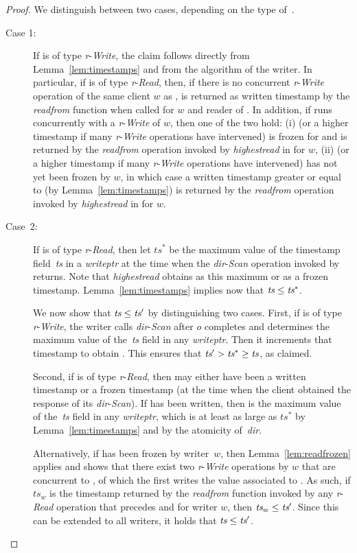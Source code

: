 \documentclass[oribibl]{llncs}
\theoremstyle{definition-boldhead}
\newcommand{\var}[1]{\textit{#1}}
\newcommand{\op}[1]{\textsl{#1}}
\newcommand{\dir}{\var{dir}\xspace}
\begin{document}
\begin{proof}
We distinguish between two cases, depending on the type of~\opr.
\begin{description}
\item[Case 1:]
If \opr is of type \var{r}-\op{Write}, the claim follows directly from
  Lemma~\ref{lem:timestamps} and from the algorithm of the writer.
  In particular, if \popr is of type \var{r}-\op{Read}, then, if there is
  no concurrent \var{r}-\op{Write} operation of the same client $w$ as \opr,
  \tsopr{} is returned as written timestamp by the \var{readfrom} function when
  called for $w$ and reader of \popr.
  In addition, if \popr runs concurrently with a
  \var{r}-\op{Write} of $w$, then one of the two hold:
  (i) \tsopr{} (or a higher timestamp if many \var{r}-\op{Write} operations
  have intervened) is frozen for \popr{} and
  is returned by the \var{readfrom} operation invoked by \var{highestread}
  in \popr for $w$, (ii) \tsopr (or a higher timestamp if many
  \var{r}-\op{Write} operations have intervened) has not yet been frozen
  by $w$, in which case a written timestamp greater or equal to \tsopr
  (by Lemma~\ref{lem:timestamps}) is returned by the \var{readfrom} operation
  invoked by \var{highestread} in \popr for $w$.

\item[Case~2:] If \opr is of type \var{r}-\op{Read}, then let
  $\var{ts}^*$ be the maximum value of the timestamp field~\var{ts} in
  a \var{writeptr} at the time when the \dir-\op{Scan} operation
  invoked by \opr returns.  Note that \op{highestread} obtains \tsopr
  as this maximum or as a frozen timestamp.
  Lemma~\ref{lem:timestamps} implies now that $\tsopr \leq
  \var{ts}^*$.

  We now show that $\var{ts} \leq \tspopr$ by distinguishing two
  cases.  First, if \popr is of type \var{r}-\op{Write}, the writer
  calls \dir-\op{Scan} after $o$ completes and determines the maximum
  value of the~\var{ts} field in any \var{writeptr}.  Then it
  increments that timestamp to obtain \tspopr.  This ensures that
  $\tspopr > \var{ts}^* \geq \tsopr$, as claimed.

  Second, if \popr is of type \var{r}-\op{Read}, then \tspopr may
  either have been a written timestamp or a frozen timestamp (at the
  time when the client obtained the response of its \dir-\op{Scan}).
  If \tspopr has been written, then \tspopr is the maximum value of
  the~\var{ts} field in any \var{writeptr}, which is at least as large
  as $\var{ts}^*$ by Lemma~\ref{lem:timestamps} and by the atomicity
  of~\dir.

  Alternatively, if \tspopr  has been frozen by writer~$w$, then
  Lemma~\ref{lem:readfrozen} applies and shows that there exist two
  \var{r}-\op{Write} operations by $w$ that are  concurrent
  to \popr, of which the first writes the value associated to \tspopr.
As such, if $ts_w$ is the timestamp returned by
  the \var{readfrom} function invoked by any \var{r}-\op{Read} operation \opr
  that precedes \popr{} and for writer $w$, then $\tsopr_w \leq \tspopr$.
  Since this can be extended to all writers, it holds that $\tsopr \leq \tspopr$.
\end{description}
\end{proof}
\end{document}
